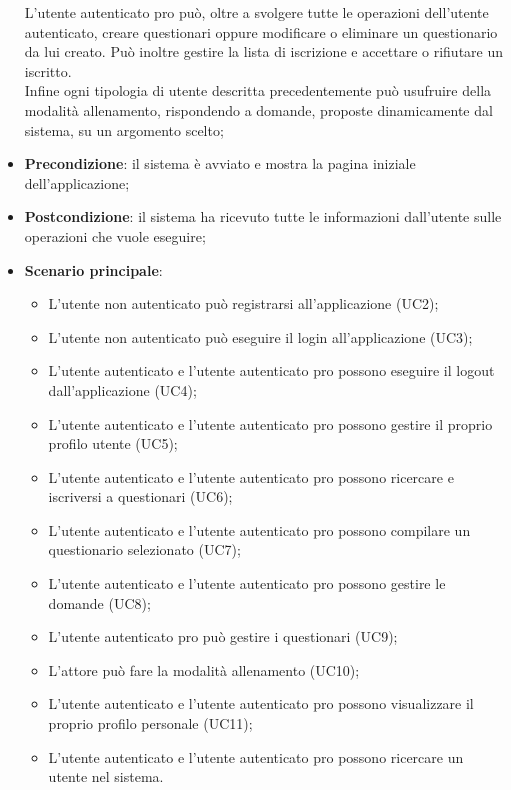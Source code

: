 \begin{itemize}
L'utente autenticato pro può, oltre a svolgere tutte le operazioni dell'utente autenticato, creare questionari oppure modificare o eliminare un questionario da lui creato. Può inoltre gestire la lista di iscrizione e accettare o rifiutare un iscritto.
\\ Infine ogni tipologia di utente descritta precedentemente può usufruire della modalità allenamento, rispondendo a domande, proposte dinamicamente dal sistema, su un argomento scelto;
\item\textbf{Precondizione}: il sistema è avviato e mostra la pagina iniziale dell'applicazione;
\item\textbf{Postcondizione}: il sistema ha ricevuto tutte le informazioni dall'utente sulle operazioni che vuole eseguire;
\item\textbf{Scenario principale}:
\begin{itemize}
\item L'utente non autenticato può registrarsi all'applicazione (UC2);
\item L'utente non autenticato può eseguire il login all'applicazione (UC3);
\item L'utente autenticato e l'utente autenticato pro possono eseguire il logout dall'applicazione (UC4); 
\item L'utente autenticato e l'utente autenticato pro possono gestire il proprio profilo utente (UC5);
\item L'utente autenticato e l'utente autenticato pro possono ricercare e iscriversi a questionari (UC6);
\item L'utente autenticato e l'utente autenticato pro possono compilare un questionario selezionato (UC7);
\item L'utente autenticato e l'utente autenticato pro possono gestire le domande (UC8);
\item L'utente autenticato pro può gestire i questionari (UC9);
\item L'attore può fare la modalità allenamento (UC10);
\item L'utente autenticato e l'utente autenticato pro possono visualizzare il proprio profilo personale (UC11);
\item L'utente autenticato e l'utente autenticato pro possono ricercare un utente nel sistema.
\end{itemize}
\end{itemize}